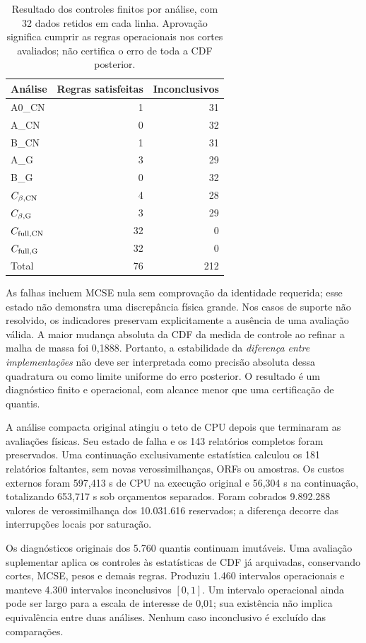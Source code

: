 \begin{table}[htbp]
\centering\small
\caption{Resultado dos controles finitos por análise, com 32 dados
retidos em cada linha. Aprovação significa cumprir as regras operacionais
nos cortes avaliados; não certifica o erro de toda a CDF posterior.}
\label{tab:comp-controles-finitos}
\begin{tabular}{lrr}
\toprule
Análise & Regras satisfeitas & Inconclusivos\\
\midrule
A0\_CN & 1 & 31\\
A\_CN & 0 & 32\\
B\_CN & 1 & 31\\
A\_G & 3 & 29\\
B\_G & 0 & 32\\
$C_{\beta,\rm CN}$ & 4 & 28\\
$C_{\beta,\rm G}$ & 3 & 29\\
$C_{{\rm full},\rm CN}$ & 32 & 0\\
$C_{{\rm full},\rm G}$ & 32 & 0\\
\midrule
Total & 76 & 212\\
\bottomrule
\end{tabular}
\end{table}

As falhas incluem MCSE nula sem comprovação da identidade requerida;
esse estado não demonstra uma discrepância física grande. Nos casos
de suporte não resolvido, os indicadores preservam explicitamente a
ausência de uma avaliação válida. A maior mudança absoluta da CDF da
medida de controle ao refinar a malha de massa foi 0,1888. Portanto, a
estabilidade da \emph{diferença entre implementações} não deve ser
interpretada como precisão absoluta dessa quadratura ou como limite
uniforme do erro posterior. O resultado é um diagnóstico finito e
operacional, com alcance menor que uma certificação de quantis.

A análise compacta original atingiu o teto de CPU depois que terminaram
as avaliações físicas. Seu estado de falha e os 143 relatórios completos
foram preservados. Uma continuação exclusivamente estatística calculou
os 181 relatórios faltantes, sem novas verossimilhanças, ORFs ou amostras.
Os custos externos foram 597,413 s de CPU na execução original e
56,304 s na continuação, totalizando 653,717 s sob orçamentos separados.
Foram cobrados 9.892.288 valores de verossimilhança dos 10.031.616
reservados; a diferença decorre das interrupções locais por saturação.

Os diagnósticos originais dos 5.760 quantis continuam imutáveis.
Uma avaliação suplementar aplica os controles às estatísticas de CDF
já arquivadas, conservando cortes, MCSE, pesos e demais regras. Produziu
1.460 intervalos operacionais e manteve 4.300 intervalos inconclusivos
$[0,1]$. Um intervalo operacional ainda pode ser largo para a escala
de interesse de 0,01; sua existência não implica equivalência entre
duas análises. Nenhum caso inconclusivo é excluído das comparações.

